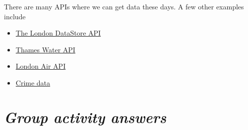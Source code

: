 \documentclass[
  letterpaper,
  DIV=11,
  numbers=noendperiod]{scrreprt}
\providecommand{\tightlist}{%
  \setlength{\itemsep}{0pt}\setlength{\parskip}{0pt}}\usepackage{longtable,booktabs,array}
\begin{document}
There are many APIs where we can get data these days. A few other
examples include

\begin{itemize}
\tightlist
\item
  \href{https://data.london.gov.uk/developers/}{The London DataStore
  API}
\item
  \href{https://data.thameswater.co.uk/s/}{Thames Water API}
\item
  \href{https://www.londonair.org.uk/Londonair/API/}{London Air API}
\item
  \href{https://data.police.uk/docs/method/crime-street/}{Crime data}
\end{itemize}

\hypertarget{group-activity-answers}{%
\section{\texorpdfstring{\emph{Group activity
answers}}{Group activity answers}}\label{group-activity-answers}}
\end{document}

